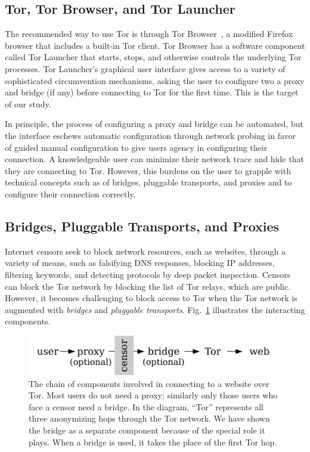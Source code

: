 \documentclass[USenglish,oneside,twocolumn]{article}
\begin{document}
\subsection{Tor, Tor Browser, and Tor Launcher}
The recommended way to use Tor is through Tor Browser~\cite{torbrowser},
a modified Firefox browser that includes a built-in Tor client.
Tor Browser has a software component called Tor Launcher that
starts, stops, and otherwise controls the underlying Tor processes.
Tor Launcher's graphical user interface gives access to a variety of 
sophisticated circumvention mechanisms, asking the user
to configure two a proxy and bridge (if any) before connecting to Tor
for the first time. This is the target of our study. 

In principle, the process of configuring a proxy and bridge can be automated, but
the interface eschews automatic configuration through network probing
in favor of guided manual configuration to give users agency in configuring their connection.
A knowledgeable user can minimize their network trace and hide that they are connecting to Tor.
However, this burdens on the user to grapple with technical concepts such as 
of bridges, pluggable transports, and proxies and to configure their connection correctly.

\subsection{Bridges, Pluggable Transports, and Proxies} 
Internet censors seek to block network resources, such as websites, through 
a variety of means, such as falsifying DNS responses, blocking IP addresses, 
filtering keywords, and detecting protocols by deep packet inspection.
Censors can block the Tor network by blocking the list of Tor relays, which 
are public. However, it becomes challenging to block access to Tor when
the Tor network is augmented with \emph{bridges} and \emph{pluggable transports}.
Fig.~\ref{fig:topology} illustrates the interacting components.

\begin{figure}
\centering
\includegraphics{topology.pdf}
\caption{
The chain of components involved in connecting to a website over Tor.
Most users do not need a proxy;
similarly only those users who face a censor need a bridge.
In the diagram, ``Tor'' represents all three anonymizing hops through the Tor network.
We have shown the bridge as a separate component
because of the special role it plays.
When a bridge is used, it takes the place of the first Tor hop.
}
\label{fig:topology}
\end{figure}
\end{document}
